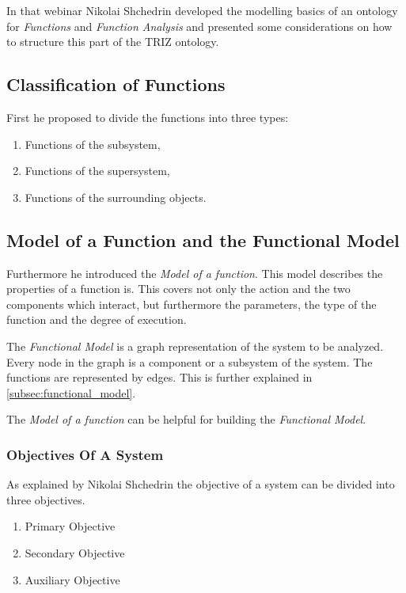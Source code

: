 \documentclass[11pt,a4paper]{article}
\begin{document}
In that webinar Nikolai Shchedrin developed the modelling basics of an
ontology for \emph{Functions} and \emph{Function Analysis} and presented some
considerations on how to structure this part of the TRIZ ontology.

\subsection{Classification of Functions}

First he proposed to divide the functions into three types:
\begin{enumerate}
\item Functions of the subsystem,
\item Functions of the supersystem,
\item Functions of the surrounding objects.
\end{enumerate}

\subsection{Model of a Function and the Functional Model}

Furthermore he introduced the \emph{Model of a function}.  This model
describes the properties of a function is. This covers not only the action and
the two components which interact, but furthermore the parameters, the type of
the function and the degree of execution.

The \emph{Functional Model} is a graph representation of the system to be
analyzed.  Every node in the graph is a component or a subsystem of the
system.  The functions are represented by edges.  This is further explained in
\ref{subsec:functional_model}.

The \emph{Model of a function} can be helpful for building the
\emph{Functional Model}.

\subsubsection{Objectives Of A System}
\label{subsubsec:objectives_system}

As explained by Nikolai Shchedrin the objective of a system can be divided
into three objectives.
\begin{enumerate}
\item Primary Objective
\item Secondary Objective
\item Auxiliary Objective
\end{enumerate}
\end{document}
